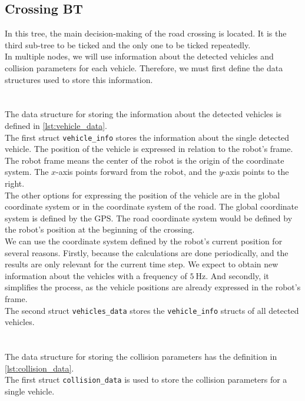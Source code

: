 \subsection{Crossing BT}
\label{sec:Crossing-BT-impl}
    In this tree, the main decision-making of the road crossing is located. It is the third sub-tree to be ticked and the only one to be ticked repeatedly.\\
    In multiple nodes, we will use information about the detected vehicles and collision parameters for each vehicle. Therefore, we must first define the data structures used to store this information.\\\\
    \\
        The data structure for storing the information about the detected vehicles is defined in \ref{lst:vehicle_data}.\\
        The first struct \texttt{vehicle\_info} stores the information about the single detected vehicle. The position of the vehicle is expressed in relation to the robot's frame. The robot frame means the center of the robot is the origin of the coordinate system. The $x$-axis points forward from the robot, and the $y$-axis points to the right.\\
        The other options for expressing the position of the vehicle are in the global coordinate system or in the coordinate system of the road. The global coordinate system is defined by the GPS. The road coordinate system would be defined by the robot's position at the beginning of the crossing.\\
        We can use the coordinate system defined by the robot's current position for several reasons. Firstly, because the calculations are done periodically, and the results are only relevant for the current time step. We expect to obtain new information about the vehicles with a frequency of $5\:\si{\Hz}$. And secondly, it simplifies the process, as the vehicle positions are already expressed in the robot's frame.\\
        The second struct \texttt{vehicles\_data} stores the \texttt{vehicle\_info} structs of all detected vehicles.\\\\
    \\
        The data structure for storing the collision parameters has the definition in \ref{lst:collision_data}.\\
        The first struct \texttt{collision\_data} is used to store the collision parameters for a single vehicle.\\
